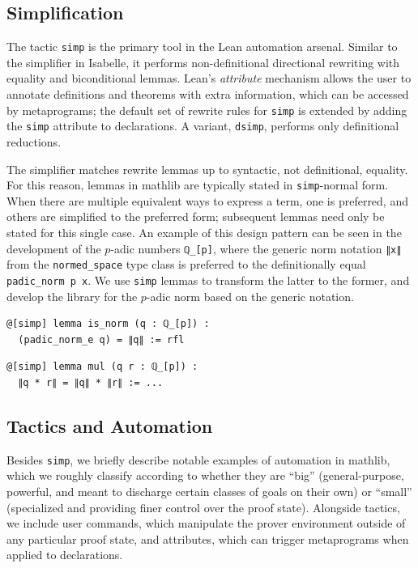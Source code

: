 \documentclass[sigplan]{acmart}\settopmatter{}
\newcommand{\mathlib}{\textsf{mathlib}\xspace}
\begin{document}
\subsection{Simplification}
\label{subsection:metaprogramming:simp}

The tactic \lstinline{simp} is the primary tool
in the Lean automation arsenal.
Similar to the simplifier in Isabelle,
it performs non-definitional directional rewriting with equality and biconditional lemmas.
Lean's \emph{attribute} mechanism allows the user
to annotate definitions and theorems with extra information,
which can be accessed by metaprograms;
the default set of rewrite rules for \lstinline{simp} is extended
by adding the \lstinline{simp} attribute to declarations.
A variant, \lstinline{dsimp}, performs only definitional reductions.

The simplifier matches rewrite lemmas up to syntactic, not definitional, equality.
For this reason, lemmas in \mathlib are typically stated in \lstinline{simp}-normal form.
When there are multiple equivalent ways to express a term,
one is preferred, and others are simplified to the preferred form;
subsequent lemmas need only be stated for this single case.
An example of this design pattern can be seen in the development of the $p$-adic numbers \lstinline{ℚ_[p]},
where the generic norm notation \lstinline{∥x∥}
from the \lstinline{normed_space} type class
is preferred to the definitionally equal \lstinline{padic_norm p x}.
We use \lstinline{simp} lemmas to transform the latter to the former,
and develop the library for the $p$-adic norm based on the generic notation.
\begin{lstlisting}
@[simp] lemma is_norm (q : ℚ_[p]) :
  (padic_norm_e q) = ∥q∥ := rfl
\end{lstlisting}
\begin{lstlisting}
@[simp] lemma mul (q r : ℚ_[p]) :
  ∥q * r∥ = ∥q∥ * ∥r∥ := ...
\end{lstlisting}

\subsection{Tactics and Automation}
\label{subsection:metaprogramming:tactics}

Besides \lstinline{simp}, we briefly describe notable examples of
automation in \mathlib, which we roughly classify according to whether
they are ``big'' (general-purpose, powerful, and meant to discharge
certain classes of goals on their own) or ``small'' (specialized and
providing finer control over the proof state).
Alongside tactics, we include user commands,
which manipulate the prover environment outside of any particular proof state,
and attributes,
which can trigger metaprograms when applied to declarations.
\end{document}
